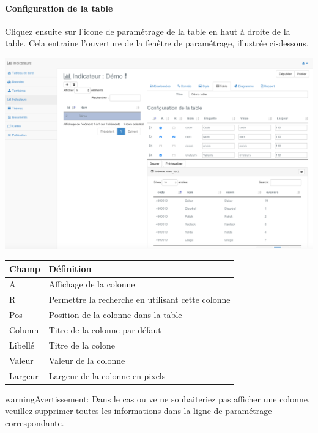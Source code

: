\documentclass[letterpaper,10pt,french]{sphinxmanual}
\begin{document}
\paragraph{Configuration de la table}

Cliquez ensuite sur l'icone de paramétrage de la table en haut à droite de la table. Cela entraine l'ouverture de la fenêtre de paramétrage, illustrée ci-dessous.

\includegraphics[width=1.000\linewidth]{set-table-parameters-window.png}

\begin{tabulary}{\linewidth}{|L|L|}
\hline

\textbf{Champ}
 & 
\textbf{Définition}
\\
\hline
A
 & 
Affichage de la colonne
\\
\hline
R
 & 
Permettre la recherche en utilisant cette colonne
\\
\hline
Pos
 & 
Position de la colonne dans la table
\\
\hline
Column
 & 
Titre de la colonne par défaut
\\
\hline
Libellé
 & 
Titre de la colone
\\
\hline
Valeur
 & 
Valeur de la colonne
\\
\hline
Largeur
 & 
Largeur de la colonne en pixels
\\
\hline\end{tabulary}


\begin{notice}{warning}{Avertissement:}
Dans le cas ou ve ne souhaiteriez pas afficher une colonne, veuillez supprimer toutes les informations dans la ligne de paramétrage correspondante.
\end{notice}
\end{document}
